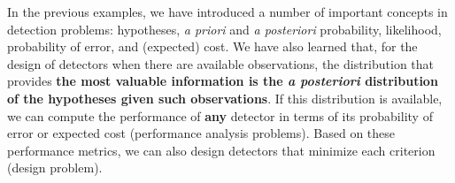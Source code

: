 In the previous examples, we have introduced a number of important concepts in detection problems: hypotheses, {\em a priori} and {\em a posteriori} probability, likelihood, probability of error, and (expected) cost. We have also learned that, for the design of detectors when there are available observations, the distribution that provides {\bf  the most valuable information is the {\em a posteriori} distribution of the hypotheses given such observations}. If this distribution is available, we can compute the performance of {\bf any} detector in terms of its probability of error or expected cost (performance analysis problems). Based on these performance metrics, we can also design detectors that minimize each criterion (design problem). 

